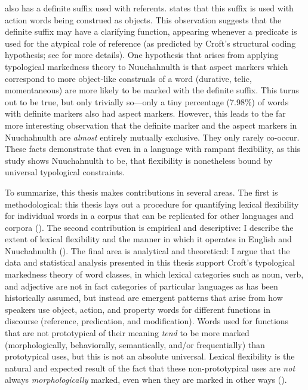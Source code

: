  also has a definite suffix  used with referents. \textcite[48]{Nakayama2001} states that this suffix is used with action words being construed as objects. This observation suggests that the definite suffix may have a clarifying function, appearing whenever a predicate is used for the atypical role of reference (as predicted by Croft's structural coding hypothesis; see  for more details). One hypothesis that arises from applying typological markedness theory to Nuuchahnulth is that aspect markers which correspond to more object-like construals of a word (durative, telic, momentaneous) are more likely to be marked with the definite suffix. This turns out to be true, but only trivially so—only a tiny percentage (7.98\%) of words with definite markers also had aspect markers. However, this leads to the far more interesting observation that the definite marker and the aspect markers in Nuuchahnulth are \emph{almost} entirely mutually exclusive. They only rarely co-occur. These facts demonstrate that even in a language with rampant flexibility, as this study shows Nuuchahnulth to be, that flexibility is nonetheless bound by universal typological constraints.

To summarize, this thesis makes contributions in several areas. The first is methodological: this thesis lays out a procedure for quantifying lexical flexibility for individual words in a corpus that can be replicated for other languages and corpora (). The second contribution is empirical and descriptive: I describe the extent of lexical flexibility and the manner in which it operates in English and Nuuchahnulth (). The final area is analytical and theoretical: I argue that the data and statistical analysis presented in this thesis support Croft's typological markedness theory of word classes, in which lexical categories such as noun, verb, and adjective are not in fact categories of particular languages as has been historically assumed, but instead are emergent patterns that arise from how speakers use object, action, and property words for different functions in discourse (reference, predication, and modification). Words used for functions that are not prototypical of their meaning \emph{tend} to be more marked (morphologically, behaviorally, semantically, and/or frequentially) than prototypical uses, but this is not an absolute universal. Lexical flexibility is the natural and expected result of the fact that these non-prototypical uses are \emph{not} always \emph{morphologically} marked, even when they are marked in other ways ().

